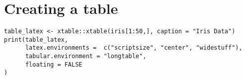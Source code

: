 \chapter{Creating a table}
\begin{verbatim}
table_latex <- xtable::xtable(iris[1:50,], caption = "Iris Data")
print(table_latex,
      latex.environments =  c("scriptsize", "center", "widestuff"),
      tabular.environment = "longtable",
      floating = FALSE
)
\end{verbatim}

\begin{kframe}
\begin{alltt}
\hlstd{(}\hlstd{)}
 \hlkwb{<-} \hlopt{::}\hlstd{(iris[}\hlopt{:}\hlstd{,],}
                               \hlstd{=} \hlstd{)}
       \hlstd{=}  \hlstd{(}\hlstd{,} \hlstd{,} \hlstd{),}
       \hlstd{=} \hlstd{,}
       \hlstd{=} 
\hlstd{)}
\end{alltt}
\end{kframe}%
